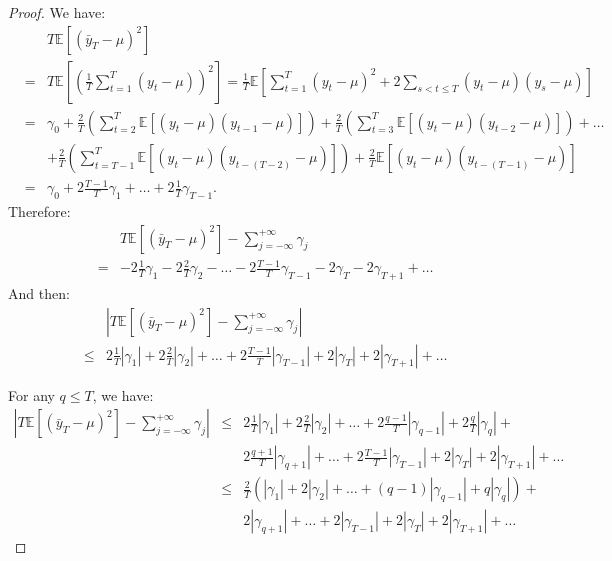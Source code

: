 \documentclass[
  11pt,
]{book}
\theoremstyle{definition}
\theoremstyle{definition}
\theoremstyle{definition}
\theoremstyle{definition}
\theoremstyle{remark}
\begin{document}
\begin{proof}
We have:
\begin{eqnarray*}
&&T\mathbb{E}\left[(\bar{y}_T - \mu)^2\right]\\
&=& T\mathbb{E}\left[\left(\frac{1}{T}\sum_{t=1}^T(y_t - \mu)\right)^2\right] = \frac{1}{T} \mathbb{E}\left[\sum_{t=1}^T(y_t - \mu)^2+2\sum_{s<t\le T}(y_t - \mu)(y_s - \mu)\right]\\
&=& \gamma_0 +\frac{2}{T}\left(\sum_{t=2}^{T}\mathbb{E}\left[(y_t - \mu)(y_{t-1} - \mu)\right]\right) +\frac{2}{T}\left(\sum_{t=3}^{T}\mathbb{E}\left[(y_t - \mu)(y_{t-2} - \mu)\right]\right) + \dots \\
&&+ \frac{2}{T}\left(\sum_{t=T-1}^{T}\mathbb{E}\left[(y_t - \mu)(y_{t-(T-2)} - \mu)\right]\right) + \frac{2}{T}\mathbb{E}\left[(y_t - \mu)(y_{t-(T-1)} - \mu)\right]\\
&=&  \gamma_0 + 2 \frac{T-1}{T}\gamma_1 + \dots + 2 \frac{1}{T}\gamma_{T-1} .
\end{eqnarray*}
Therefore:
\begin{eqnarray*}
&& T\mathbb{E}\left[(\bar{y}_T - \mu)^2\right] - \sum_{j=-\infty}^{+\infty} \gamma_j \\
&=& - 2\frac{1}{T}\gamma_1 - 2\frac{2}{T}\gamma_2 - \dots - 2\frac{T-1}{T}\gamma_{T-1} - 2\gamma_T - 2 \gamma_{T+1} + \dots
\end{eqnarray*}
And then:
\begin{eqnarray*}
&& \left|T\mathbb{E}\left[(\bar{y}_T - \mu)^2\right] - \sum_{j=-\infty}^{+\infty} \gamma_j\right|\\
&\le& 2\frac{1}{T}|\gamma_1| + 2\frac{2}{T}|\gamma_2| + \dots + 2\frac{T-1}{T}|\gamma_{T-1}| + 2|\gamma_T| + 2 |\gamma_{T+1}| + \dots
\end{eqnarray*}

For any \(q \le T\), we have:
\begin{eqnarray*}
\left|T\mathbb{E}\left[(\bar{y}_T - \mu)^2\right] - \sum_{j=-\infty}^{+\infty} \gamma_j\right| &\le& 2\frac{1}{T}|\gamma_1| + 2\frac{2}{T}|\gamma_2| + \dots + 2\frac{q-1}{T}|\gamma_{q-1}| +2\frac{q}{T}|\gamma_q| +\\
&&2\frac{q+1}{T}|\gamma_{q+1}| + \dots  + 2\frac{T-1}{T}|\gamma_{T-1}| + 2|\gamma_T| + 2 |\gamma_{T+1}| + \dots\\
&\le& \frac{2}{T}\left(|\gamma_1| + 2|\gamma_2| + \dots + (q-1)|\gamma_{q-1}| +q|\gamma_q|\right) +\\
&&2|\gamma_{q+1}| + \dots  + 2|\gamma_{T-1}| + 2|\gamma_T| + 2 |\gamma_{T+1}| + \dots
\end{eqnarray*}


\end{proof}
\end{document}
